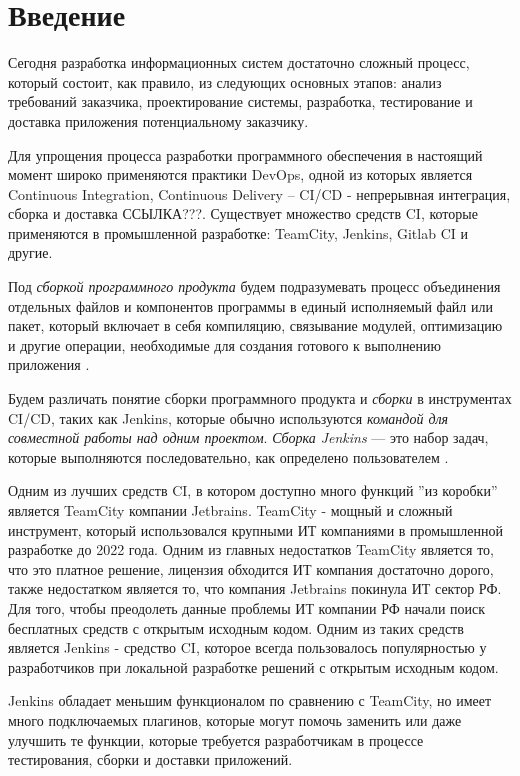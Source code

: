 \chapter*{Введение} %

Сегодня разработка информационных систем достаточно сложный процесс, который состоит, как правило, из следующих основных этапов: анализ требований заказчика, проектирование системы, разработка, тестирование и доставка приложения потенциальному заказчику. 

Для упрощения процесса разработки программного обеспечения в настоящий момент широко применяются практики DevOps, одной из которых является Continuous Integration, Continuous Delivery -- CI/CD - непрерывная интеграция, сборка и доставка ССЫЛКА???. Существует множество средств CI, которые применяются в промышленной разработке: TeamCity, Jenkins, Gitlab CI и другие.

Под \textit{сборкой программного продукта} будем подразумевать процесс объединения отдельных файлов и компонентов программы в единый исполняемый файл или пакет, который включает в себя компиляцию, связывание модулей, оптимизацию и другие операции, необходимые для создания готового к выполнению приложения \cite{build}.

Будем различать понятие сборки программного продукта и \textit{сборки} в инструментах CI/CD, таких как Jenkins, которые обычно используются \textit{командой для совместной работы над одним проектом}. \textit{Сборка Jenkins} — это набор задач, которые выполняются последовательно, как определено пользователем \cite{jenkinsjob}.

Одним из лучших средств CI, в котором доступно много функций ''из коробки'' является TeamCity компании Jetbrains. TeamCity - мощный и сложный инструмент, который использовался крупными ИТ компаниями в промышленной разработке до 2022 года. Одним из главных недостатков TeamCity является то, что это платное решение, лицензия обходится ИТ компания достаточно дорого, также недостатком является то, что компания Jetbrains покинула ИТ сектор РФ. Для того, чтобы преодолеть данные проблемы ИТ компании РФ начали поиск бесплатных средств с открытым исходным кодом. Одним из таких средств является Jenkins - средство CI, которое всегда пользовалось популярностью у разработчиков при локальной разработке решений с открытым исходным кодом. 

Jenkins обладает меньшим функционалом по сравнению с TeamCity, но имеет много подключаемых плагинов, которые могут помочь заменить или даже улучшить те функции, которые требуется разработчикам в процессе тестирования, сборки и доставки приложений.


